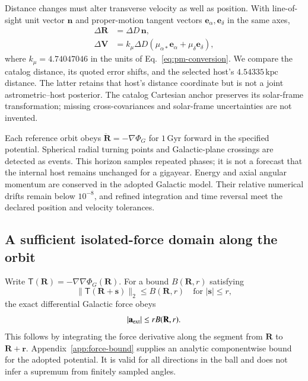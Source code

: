 \documentclass[aps,prd,reprint,amsmath,amssymb,superscriptaddress,nofootinbib,longbibliography,floatfix]{revtex4-2}
\begin{document}
Distance changes must alter transverse velocity as well as position. With line-of-sight unit vector $\mathbf n$ and proper-motion tangent vectors $\mathbf e_\alpha,\mathbf e_\delta$ in the same axes,
\begin{align}
\Delta\mathbf R&=\Delta D\,\mathbf n,\nonumber\\
\Delta\mathbf V&=k_\mu\Delta D
(\mu_{\alpha*}\mathbf e_\alpha+\mu_\delta\mathbf e_\delta),
\label{eq:distance-phase-point}
\end{align}
where $k_\mu=4.74047046$ in the units of Eq.~\eqref{eq:pm-conversion}. We compare the catalog distance, its quoted error shifts, and the selected host's $4.54335\,\mathrm{kpc}$ distance. The latter retains that host's distance coordinate but is not a joint astrometric--host posterior. The catalog Cartesian anchor preserves its solar-frame transformation; missing cross-covariances and solar-frame uncertainties are not invented.

Each reference orbit obeys $\ddot{\mathbf R}=-\nabla\Phi_G$ for $1\,\mathrm{Gyr}$ forward in the specified potential. Spherical radial turning points and Galactic-plane crossings are detected as events. This horizon samples repeated phases; it is not a forecast that the internal host remains unchanged for a gigayear. Energy and axial angular momentum are conserved in the adopted Galactic model. Their relative numerical drifts remain below $10^{-8}$, and refined integration and time reversal meet the declared position and velocity tolerances.

\subsection{A sufficient isolated-force domain along the orbit}

Write $\mathsf T(\mathbf R)=-\nabla\nabla\Phi_G(\mathbf R)$. For a bound $B(\mathbf R,r)$ satisfying
\begin{equation}
\|\mathsf T(\mathbf R+\mathbf s)\|_2\le B(\mathbf R,r)
\quad\text{for }|\mathbf s|\le r,
\label{eq:hessian-ball-bound}
\end{equation}
the exact differential Galactic force obeys
\begin{equation}
|\mathbf a_{\rm ext}|\le r B(\mathbf R,r).
\label{eq:force-bound-orbit}
\end{equation}
This follows by integrating the force derivative along the segment from $\mathbf R$ to $\mathbf R+\mathbf r$. Appendix~\ref{app:force-bound} supplies an analytic componentwise bound for the adopted potential. It is valid for all directions in the ball and does not infer a supremum from finitely sampled angles.
\end{document}
